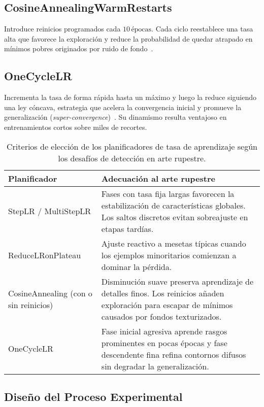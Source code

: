 \subsection*{CosineAnnealingWarmRestarts}
Introduce reinicios programados cada \(10\,\text{épocas}\). Cada ciclo reestablece una tasa alta que favorece la exploración y reduce la probabilidad de quedar atrapado en mínimos pobres originados por ruido de fondo~\cite{loshchilov2017}.

\subsection*{OneCycleLR}
Incrementa la tasa de forma rápida hasta un máximo y luego la reduce siguiendo una ley cóncava, estrategia que acelera la convergencia inicial y promueve la generalización (\emph{super-convergence})~\cite{smith2019}.
Su dinamismo resulta ventajoso en entrenamientos cortos sobre miles de recortes.

\begin{table}[h]
    \centering
    \begin{tabular}{p{3.8cm} p{10.4cm}}
        \hline
        \textbf{Planificador} & \textbf{Adecuación al arte rupestre} \\
        \hline
        StepLR / MultiStepLR & Fases con tasa fija largas favorecen la estabilización de características globales. Los saltos discretos evitan sobreajuste en etapas tardías. \\[0.3em]
        ReduceLRonPlateau & Ajuste reactivo a mesetas típicas cuando los ejemplos minoritarios comienzan a dominar la pérdida. \\[0.3em]
        CosineAnnealing (con o sin reinicios) & Disminución suave preserva aprendizaje de detalles finos. Los reinicios añaden exploración para escapar de mínimos causados por fondos texturizados. \\[0.3em]
        OneCycleLR & Fase inicial agresiva aprende rasgos prominentes en pocas épocas y fase descendente fina refina contornos difusos sin degradar la generalización. \\
    \end{tabular}
    \caption{Criterios de elección de los planificadores de tasa de aprendizaje según los desafíos de detección en arte rupestre.}
    \label{tab:lr_schedulers}
\end{table}

\subsection{Diseño del Proceso Experimental}


